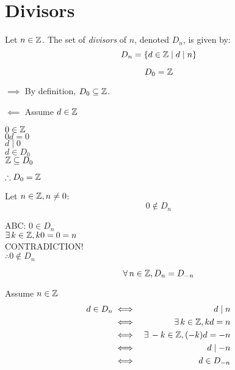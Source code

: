 \documentclass[letterpaper,12pt,fleqn]{article}
\begin{document}
\section*{Divisors}

\begin{definition}
  Let $n\in\mathbb{Z}$. The set of \emph{divisors} of $n$, denoted $D_n$, is given by:
  \[D_n=\{d\in\mathbb{Z}\mid d\mid n\}\]
\end{definition}

\begin{theorem}
  \listbreak
  \[D_0=\mathbb{Z}\]
\end{theorem}

\begin{theproof}
  \listbreak
  \begin{description}
  \item{$\implies$} By definition, $D_0\subseteq\mathbb{Z}$.
  \item{$\impliedby$} Assume $d\in\mathbb{Z}$

    $0\in\mathbb{Z}$ \\
    $0d=0$ \\
    $d\mid0$ \\
    $d\in D_0$ \\
    $\mathbb{Z}\subseteq D_0$
  \end{description}
  $\therefore D_0=\mathbb{Z}$
\end{theproof}

\begin{theorem}
  Let $n\in\mathbb{Z},n\ne0$:
  \[0\notin D_n\]
\end{theorem}

\begin{theproof}
  ABC: $0\in D_n$ \\
  $\exists\,k\in\mathbb{Z},k0=0=n$ \\
  CONTRADICTION! \\
  $\therefore 0\notin D_n$
\end{theproof}

\begin{theorem}
  \listbreak
  \[\forall\,n\in\mathbb{Z},D_n=D_{-n}\]
\end{theorem}
\newpage
\begin{theproof}
  Assume $n\in\mathbb{Z}$
  \begin{eqnarray*}
    d\in D_n &\iff& d\mid n \\
    &\iff& \exists\,k\in\mathbb{Z},kd=n \\
    &\iff& \exists\,-k\in\mathbb{Z},(-k)d=-n \\
    &\iff& d\mid -n \\
    &\iff& d\in D_{-n} \\
  \end{eqnarray*}
\end{theproof}
\end{document}
